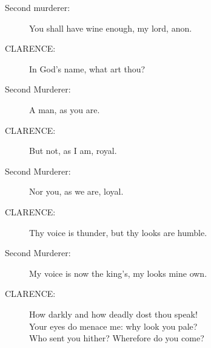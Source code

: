 \documentclass{article}
\begin{document}
\begin{description}
\item[Second murderer:] 
\hspace{1pt}You shall have wine enough, my lord, anon.\\
\end{description}
\begin{description}
\item[CLARENCE:] 
\hspace{1pt}In God's name, what art thou?\\
\end{description}
\begin{description}
\item[Second Murderer:] 
\hspace{1pt}A man, as you are.\\
\end{description}
\begin{description}
\item[CLARENCE:] 
\hspace{1pt}But not, as I am, royal.\\
\end{description}
\begin{description}
\item[Second Murderer:] 
\hspace{1pt}Nor you, as we are, loyal.\\
\end{description}
\begin{description}
\item[CLARENCE:] 
\hspace{1pt}Thy voice is thunder, but thy looks are humble.\\
\end{description}
\begin{description}
\item[Second Murderer:] 
\hspace{1pt}My voice is now the king's, my looks mine own.\\
\end{description}
\begin{description}
\item[CLARENCE:] 
\hspace{1pt}How darkly and how deadly dost thou speak!\\
\hspace{1pt}Your eyes do menace me: why look you pale?\\
\hspace{1pt}Who sent you hither? Wherefore do you come?\\
\end{description}
\end{document}

